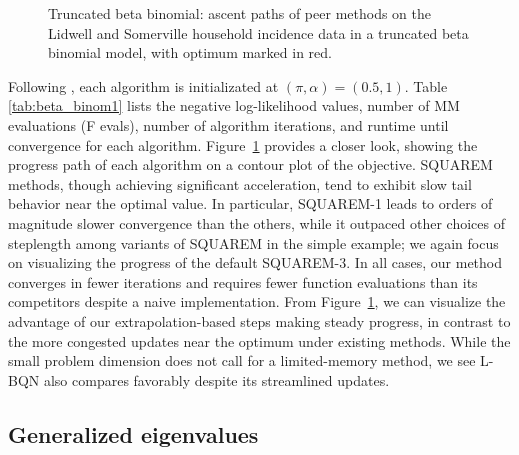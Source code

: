 \documentclass{statsoc}
\begin{document}
\begin{figure}
     
     \caption{Truncated beta binomial: ascent paths of peer methods on the Lidwell and Somerville household incidence data in a truncated beta binomial model, with  optimum marked in red.}%
    
     \label{fig:beta-contour}
 \end{figure}

Following \cite{zhou2011quasi}, each algorithm is  initializated at $(\pi, \alpha) = (0.5, 1)$. %
Table \ref{tab:beta_binom1} lists the negative log-likelihood values, number of MM evaluations (F evals), number of algorithm iterations, and runtime until convergence for each algorithm. %
Figure~\ref{fig:beta-contour} provides a closer look, showing the progress path of each algorithm on a contour plot of the objective. SQUAREM methods, though achieving significant acceleration, tend to exhibit slow tail behavior near the optimal value. In particular, SQUAREM-1 leads to orders of magnitude slower convergence than the others, while it outpaced other choices of steplength among variants of SQUAREM in the simple example; we again focus on visualizing the progress of the default SQUAREM-3. In all cases, our method converges in fewer iterations and requires fewer function evaluations than its competitors despite a naive implementation. From Figure~\ref{fig:beta-contour}, we can visualize the advantage of our extrapolation-based steps making steady progress, in contrast to the more congested updates near the optimum under existing methods. While the small problem dimension does not call for a limited-memory method, we see L-BQN also compares favorably despite its streamlined updates. %



\subsection{Generalized eigenvalues} \label{ex:gen.eigen}
\end{document}
